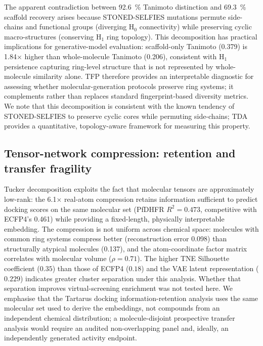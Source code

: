 \documentclass[pdflatex,sn-mathphys-num]{sn-jnl}%
\begin{document}
The apparent contradiction between \qty{92.6}{\percent} Tanimoto distinction and \qty{69.3}{\percent} scaffold recovery arises because STONED-SELFIES mutations permute side-chains and functional groups (diverging H$_0$ connectivity) while preserving cyclic macro-structures (conserving H$_1$ ring topology). This decomposition has practical implications for generative-model evaluation: scaffold-only Tanimoto (\num{0.379}) is \num{1.84}$\times$ higher than whole-molecule Tanimoto (\num{0.206}), consistent with H$_1$ persistence capturing ring-level structure that is not represented by whole-molecule similarity alone. TFP therefore provides an interpretable diagnostic for assessing whether molecular-generation protocols preserve ring systems; it complements rather than replaces standard fingerprint-based diversity metrics. We note that this decomposition is consistent with the known tendency of STONED-SELFIES to preserve cyclic cores while permuting side-chains; TDA provides a quantitative, topology-aware framework for measuring this property.

\subsection{Tensor-network compression: retention and transfer fragility}

Tucker decomposition exploits the fact that molecular tensors are approximately low-rank: the \num{6.1}$\times$ real-atom compression retains information sufficient to predict docking scores on the same molecular set (PfDHFR $R^2 = \num{0.473}$, competitive with ECFP4's \num{0.461}) while providing a fixed-length, physically interpretable embedding. The compression is not uniform across chemical space: molecules with common ring systems compress better (reconstruction error \num{0.098}) than structurally atypical molecules (\num{0.137}), and the atom-coordinate factor matrix correlates with molecular volume ($\rho = \num{0.71}$). The higher TNE Silhouette coefficient ($\num{0.35}$) than those of ECFP4 ($\num{0.18}$) and the VAE latent representation ($\num{0.229}$) indicates greater cluster separation under this analysis. Whether that separation improves virtual-screening enrichment was not tested here. We emphasise that the Tartarus docking information-retention analysis uses the same molecular set used to derive the embeddings, not compounds from an independent chemical distribution; a molecule-disjoint prospective transfer analysis would require an audited non-overlapping panel and, ideally, an independently generated activity endpoint.
\end{document}
